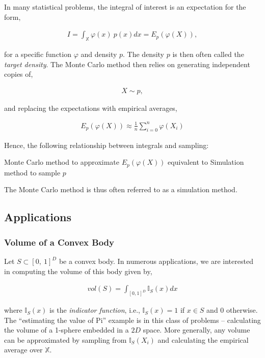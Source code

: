\documentclass[11pt,a4paper]{article}
\begin{document}
In many statistical problems, the integral of interest is an expectation
for the form,

\begin{align}I = \int_{\mathbb{X}}^{}{\varphi(x)\ p(x)}dx = E_{p}\left( \varphi(X) \right),\end{align}

for a specific function \(\varphi\) and density \(p\). The density \(p\)
is then often called the \emph{target density}. The Monte Carlo method
then relies on generating independent copies of,

\begin{align}X \sim p,\end{align}

and replacing the expectations with empirical averages,

\begin{align}E_{p}\left( \varphi(X) \right) \approx \frac{1}{n}\sum_{i = 0}^{n}{\varphi(X_{i})}\end{align}

Hence, the following relationship between integrals and sampling:

Monte Carlo method to approximate \(E_{p}\left( \varphi(X) \right)\) equivalent to
Simulation method to sample \(p\)

The Monte Carlo method is thus often referred to as a simulation method.

\subsection{Applications}\label{applications}

\subsubsection{Volume of a Convex Body}\label{volume-of-a-convex-body}

Let \(S \subset [ 0,\ 1]^{D}\) be a convex body. In numerous
applications, we are interested in computing the volume of this body
given by,

\begin{align}vol(S) = \int_{[ 0,1]^{D}}^{}{\mathbb{I}_{S}(x)}dx\end{align}

where \(\mathbb{I}_{S}(x)\) is the \emph{indicator function}, i.e.,
\(\mathbb{I}_{S}(x) = 1\) if \(x \in S\) and \(0\) otherwise. The
``estimating the value of Pi'' example is in this class of problems --
calculating the volume of a 1-sphere embedded in a \(2D\) space. More
generally, any volume can be approximated by sampling from
\(\mathbb{I}_{S}(X_{i})\) and calculating the empirical average over
\(\mathbb{X}\).
\end{document}

